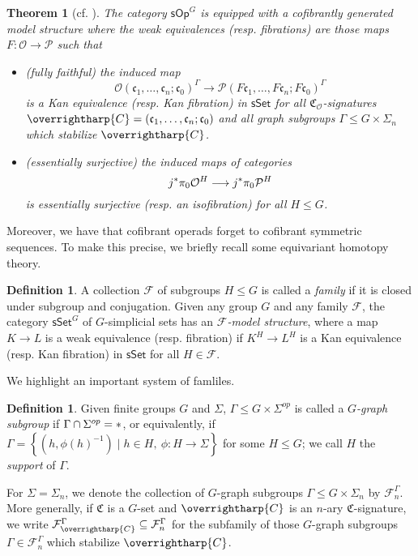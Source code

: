 \documentclass[a4paper,10pt
,draft
]{article}%
\numberwithin{equation}{section}
\numberwithin{figure}{section}
\newtheorem{theorem}[equation]{Theorem}%
\theoremstyle{definition} %
\newtheorem{definition}[equation]{Definition}%
\newcommand{\sets}[2]{\left\{ #1 \;|\; #2\right\}}%
\newcommand{\longto}{\longrightarrow}%
\newcommand{\vect}[1]{\text{\overrightharp{\ensuremath{#1}}}}
\newcommand{\sSet}{\ensuremath{\mathsf{sSet}}}%
\newcommand{\sOp}{\ensuremath{\mathsf{sOp}}}%
\newcommand{\F}{\ensuremath{\mathcal F}}
\renewcommand{\O}{\ensuremath{\mathcal O}}
\renewcommand{\P}{\ensuremath{\mathcal P}}
\newcommand{\1}{\ensuremath{\mathbbm 1}}%
\begin{document}
\begin{theorem}[{cf. \cite[Thm. III, Prop. 4.78]{BP_HGOP}}] %
      \label{SOPG_THM}
      The category $\sOp^G$ is equipped with a cofibrantly generated model structure where the weak equivalences (resp. fibrations) are those maps
      $F \colon \O \to \P$ such that
      \begin{itemize}
      \item (fully faithful) the induced map
            \begin{equation}
                  \label{DKEQUIV_EQ}
                  \O(\mathfrak c_1, \dots, \mathfrak c_n; \mathfrak c_0)^\Gamma \longto \P(F \mathfrak c_1, \dots, F \mathfrak c_n; F \mathfrak c_0)^\Gamma
            \end{equation}
            is a Kan equivalence (resp. Kan fibration) in $\sSet$
            for all $\mathfrak C_\O$-signatures $\vect C = (\mathfrak c_1, \dots, \mathfrak c_n; \mathfrak c_0)$
            and all \textit{graph subgroups} $\Gamma \leq G \times \Sigma_n$ which stabilize $\vect C$.
      \item (essentially surjective) the induced maps of categories
            \[
                  j^{\**}\pi_0 \O^H \longto j^{\**}\pi_0 \P^H
            \]
            is essentially surjective (resp. an isofibration) for all $H \leq G$.
      \end{itemize}
\end{theorem}

Moreover, we have that cofibrant operads forget to cofibrant symmetric sequences.
To make this precise, we briefly recall some equivariant homotopy theory.
\begin{definition}
      A collection $\F$ of subgroups $H \leq G$ is called a \textit{family}
      if it is closed under subgroup and conjugation.
      Given any group $G$ and any family $\F$, the category $\sSet^G$ of $G$-simplicial sets has an \textit{$\F$-model structure},
      where a map $K \to L$ is a weak equivalence (resp. fibration) if
      $K^H \to L^H$ is a Kan equivalence (resp. Kan fibration) in $\sSet$ for all $H \in \F$.
\end{definition}

We highlight an important system of famliles.
\begin{definition}
      Given finite groups $G$ and $\Sigma$, $\Gamma \leq G \times \Sigma^{op}$ is called a \textit{$G$-graph subgroup} if
      $\Gamma \cap \Sigma^{op} = \**$,
      or equivalently, if $\Gamma = \sets{(h,\phi(h)^{-1})}{h \in H,\ \phi \colon H \to \Sigma}$ for some $H \leq G$;
      we call $H$ the \textit{support} of $\Gamma$.
      
      For $\Sigma = \Sigma_n$, we denote the collection of $G$-graph subgroups $\Gamma \leq G \times \Sigma_n$ by $\F^\Gamma_n$.
      More generally, if $\mathfrak C$ is a $G$-set and $\vect C$ is an $n$-ary $\mathfrak C$-signature,
      we write $\F^\Gamma_{\vect C} \subseteq \F^\Gamma_n$ for the subfamily of those $G$-graph subgroups $\Gamma \in \F^{\Gamma}_n$ which stabilize $\vect C$.
\end{definition}
\end{document}
